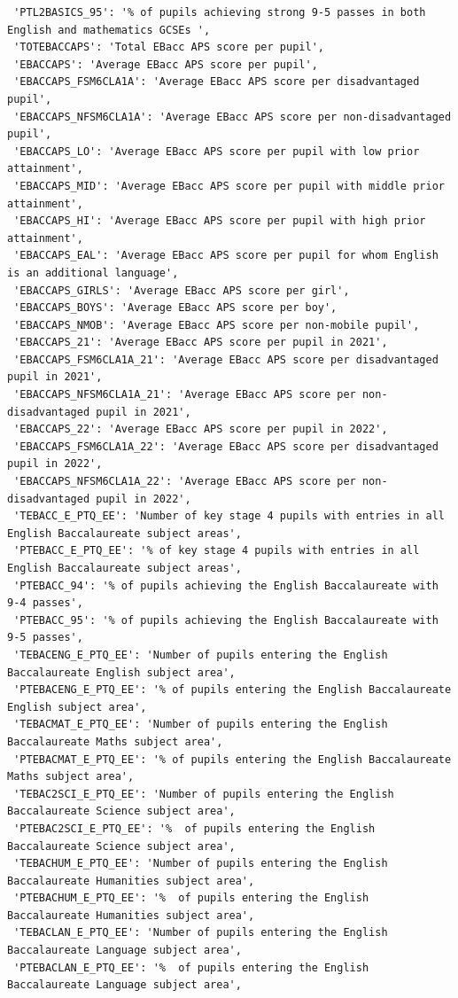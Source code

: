 \documentclass[
  letterpaper,
  DIV=11,
  numbers=noendperiod]{scrartcl}
\begin{document}
\begin{verbatim}
 'PTL2BASICS_95': '% of pupils achieving strong 9-5 passes in both English and mathematics GCSEs ',
 'TOTEBACCAPS': 'Total EBacc APS score per pupil',
 'EBACCAPS': 'Average EBacc APS score per pupil',
 'EBACCAPS_FSM6CLA1A': 'Average EBacc APS score per disadvantaged pupil',
 'EBACCAPS_NFSM6CLA1A': 'Average EBacc APS score per non-disadvantaged pupil',
 'EBACCAPS_LO': 'Average EBacc APS score per pupil with low prior attainment',
 'EBACCAPS_MID': 'Average EBacc APS score per pupil with middle prior attainment',
 'EBACCAPS_HI': 'Average EBacc APS score per pupil with high prior attainment',
 'EBACCAPS_EAL': 'Average EBacc APS score per pupil for whom English is an additional language',
 'EBACCAPS_GIRLS': 'Average EBacc APS score per girl',
 'EBACCAPS_BOYS': 'Average EBacc APS score per boy',
 'EBACCAPS_NMOB': 'Average EBacc APS score per non-mobile pupil',
 'EBACCAPS_21': 'Average EBacc APS score per pupil in 2021',
 'EBACCAPS_FSM6CLA1A_21': 'Average EBacc APS score per disadvantaged pupil in 2021',
 'EBACCAPS_NFSM6CLA1A_21': 'Average EBacc APS score per non-disadvantaged pupil in 2021',
 'EBACCAPS_22': 'Average EBacc APS score per pupil in 2022',
 'EBACCAPS_FSM6CLA1A_22': 'Average EBacc APS score per disadvantaged pupil in 2022',
 'EBACCAPS_NFSM6CLA1A_22': 'Average EBacc APS score per non-disadvantaged pupil in 2022',
 'TEBACC_E_PTQ_EE': 'Number of key stage 4 pupils with entries in all English Baccalaureate subject areas',
 'PTEBACC_E_PTQ_EE': '% of key stage 4 pupils with entries in all English Baccalaureate subject areas',
 'PTEBACC_94': '% of pupils achieving the English Baccalaureate with 9-4 passes',
 'PTEBACC_95': '% of pupils achieving the English Baccalaureate with 9-5 passes',
 'TEBACENG_E_PTQ_EE': 'Number of pupils entering the English Baccalaureate English subject area',
 'PTEBACENG_E_PTQ_EE': '% of pupils entering the English Baccalaureate English subject area',
 'TEBACMAT_E_PTQ_EE': 'Number of pupils entering the English Baccalaureate Maths subject area',
 'PTEBACMAT_E_PTQ_EE': '% of pupils entering the English Baccalaureate Maths subject area',
 'TEBAC2SCI_E_PTQ_EE': 'Number of pupils entering the English Baccalaureate Science subject area',
 'PTEBAC2SCI_E_PTQ_EE': '%  of pupils entering the English Baccalaureate Science subject area',
 'TEBACHUM_E_PTQ_EE': 'Number of pupils entering the English Baccalaureate Humanities subject area',
 'PTEBACHUM_E_PTQ_EE': '%  of pupils entering the English Baccalaureate Humanities subject area',
 'TEBACLAN_E_PTQ_EE': 'Number of pupils entering the English Baccalaureate Language subject area',
 'PTEBACLAN_E_PTQ_EE': '%  of pupils entering the English Baccalaureate Language subject area',

\end{verbatim}
\end{document}
